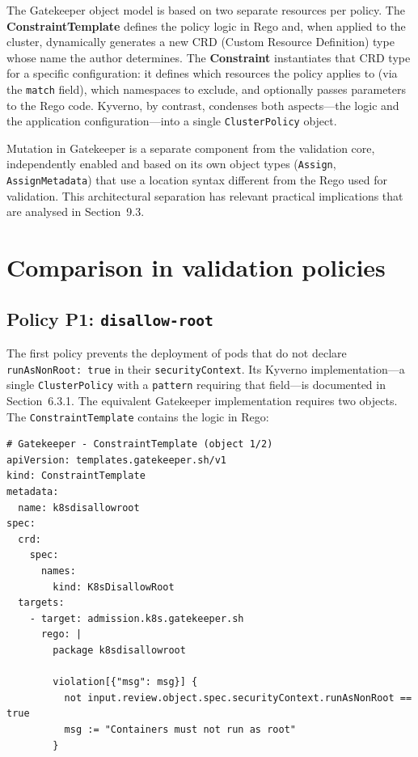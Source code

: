 The Gatekeeper object model is based on two separate resources per policy. The \textbf{ConstraintTemplate} defines the policy logic in Rego and, when applied to the cluster, dynamically generates a new CRD (Custom Resource Definition) type whose name the author determines. The \textbf{Constraint} instantiates that CRD type for a specific configuration: it defines which resources the policy applies to (via the \texttt{match} field), which namespaces to exclude, and optionally passes parameters to the Rego code. Kyverno, by contrast, condenses both aspects---the logic and the application configuration---into a single \texttt{ClusterPolicy} object.

Mutation in Gatekeeper \cite{gatekeeper_mutation} is a separate component from the validation core, independently enabled and based on its own object types (\texttt{Assign}, \texttt{AssignMetadata}) that use a location syntax different from the Rego used for validation. This architectural separation has relevant practical implications that are analysed in Section~9.3.

\section{Comparison in validation policies}

\subsection{Policy P1: \texttt{disallow-root}}

The first policy prevents the deployment of pods that do not declare \texttt{runAsNonRoot:\,true} in their \texttt{securityContext}. Its Kyverno implementation---a single \texttt{ClusterPolicy} with a \texttt{pattern} requiring that field---is documented in Section~6.3.1. The equivalent Gatekeeper implementation requires two objects. The \texttt{ConstraintTemplate} contains the logic in Rego:

\begin{lstlisting}
# Gatekeeper - ConstraintTemplate (object 1/2)
apiVersion: templates.gatekeeper.sh/v1
kind: ConstraintTemplate
metadata:
  name: k8sdisallowroot
spec:
  crd:
    spec:
      names:
        kind: K8sDisallowRoot
  targets:
    - target: admission.k8s.gatekeeper.sh
      rego: |
        package k8sdisallowroot

        violation[{"msg": msg}] {
          not input.review.object.spec.securityContext.runAsNonRoot == true
          msg := "Containers must not run as root"
        }
\end{lstlisting}

